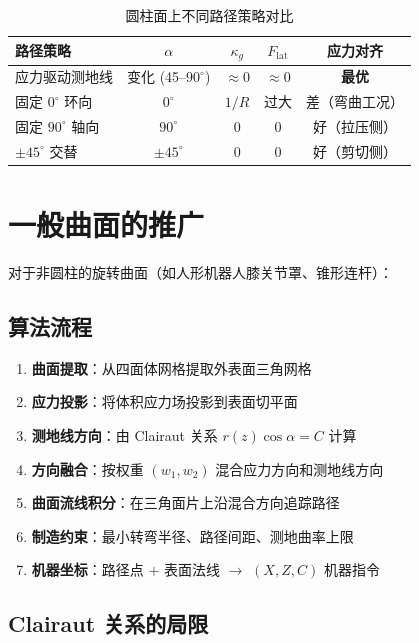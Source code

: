 \documentclass[11pt,a4paper]{article}
\begin{document}
\begin{table}[H]
\centering
\begin{tabular}{lcccc}
\toprule
\textbf{路径策略} & $\alpha$ & $\kappa_g$ & $F_\text{lat}$ & \textbf{应力对齐} \\
\midrule
应力驱动测地线 & 变化 (45--$90^\circ$) & $\approx 0$ & $\approx 0$ & \textcolor{pass}{\textbf{最优}} \\
固定 $0^\circ$ 环向 & $0^\circ$ & $1/R$ & \textcolor{fail}{过大} & 差（弯曲工况） \\
固定 $90^\circ$ 轴向 & $90^\circ$ & 0 & 0 & 好（拉压侧） \\
$\pm 45^\circ$ 交替 & $\pm 45^\circ$ & 0 & 0 & 好（剪切侧） \\
\bottomrule
\end{tabular}
\caption{圆柱面上不同路径策略对比}
\end{table}


\section{一般曲面的推广}

对于非圆柱的旋转曲面（如人形机器人膝关节罩、锥形连杆）：

\subsection{算法流程}

\begin{enumerate}[nosep]
\item \textbf{曲面提取}：从四面体网格提取外表面三角网格
\item \textbf{应力投影}：将体积应力场投影到表面切平面
\item \textbf{测地线方向}：由 Clairaut 关系 $r(z)\cos\alpha = C$ 计算
\item \textbf{方向融合}：按权重 $(w_1, w_2)$ 混合应力方向和测地线方向
\item \textbf{曲面流线积分}：在三角面片上沿混合方向追踪路径
\item \textbf{制造约束}：最小转弯半径、路径间距、测地曲率上限
\item \textbf{机器坐标}：路径点 $+$ 表面法线 $\to$ $(X, Z, C)$ 机器指令
\end{enumerate}

\subsection{Clairaut 关系的局限}
\end{document}
